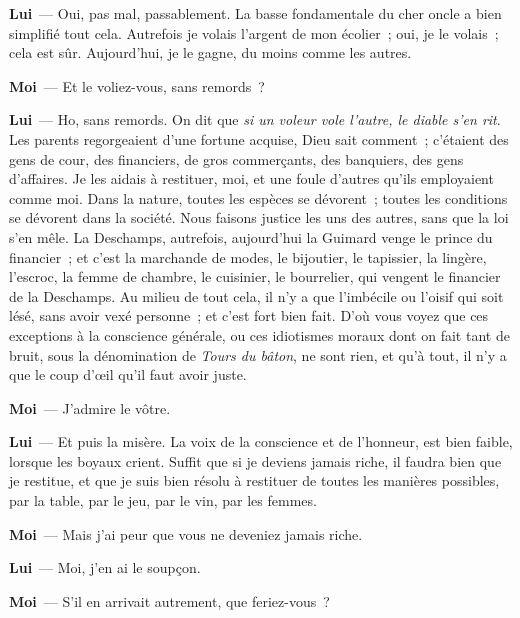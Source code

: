 \documentclass[french,twoside]{book} %
\newcommand{\labelchar}[1]{\textbf{\color{rubric} #1}}
\begin{document}
\labelchar{Lui} — Oui, pas mal, passablement. La basse fondamentale du cher oncle a bien simplifié tout cela. Autrefois je volais l’argent de mon écolier ; oui, je le volais ; cela est sûr. Aujourd’hui, je le gagne, du moins comme les autres.\par
\labelchar{Moi} — Et le voliez-vous, sans remords ?\par
\labelchar{Lui} — Ho, sans remords. On dit que \emph{si un voleur vole l’autre, le diable s’en rit}. Les parents regorgeaient d’une fortune acquise, Dieu sait comment ; c’étaient des gens de cour, des financiers, de gros commerçants, des banquiers, des gens d’affaires. Je les aidais à restituer, moi, et une foule d’autres qu’ils employaient comme moi. Dans la nature, toutes les espèces se dévorent ; toutes les conditions se dévorent dans la société. Nous faisons justice les uns des autres, sans que la loi s’en mêle. La Deschamps, autrefois, aujourd’hui la Guimard venge le prince du financier ; et c’est la marchande de modes, le bijoutier, le tapissier, la lingère, l’escroc, la femme de chambre, le cuisinier, le bourrelier, qui vengent le financier de la Deschamps. Au milieu de tout cela, il n’y a que l’imbécile ou l’oisif qui soit lésé, sans avoir vexé personne ; et c’est fort bien fait. D’où vous voyez que ces exceptions à la conscience générale, ou ces idiotismes moraux dont on fait tant de bruit, sous la dénomination de\emph{ Tours du bâton}, ne sont rien, et qu’à tout, il n’y a que le coup d’œil qu’il faut avoir juste.\par
\labelchar{Moi} — J’admire le vôtre.\par
\labelchar{Lui} — Et puis la misère. La voix de la conscience et de l’honneur, est bien faible, lorsque les boyaux crient. Suffit que si je deviens jamais riche, il faudra bien que je restitue, et que je suis bien résolu à restituer de toutes les manières possibles, par la table, par le jeu, par le vin, par les femmes.\par
\labelchar{Moi} — Mais j’ai peur que vous ne deveniez jamais riche.\par
\labelchar{Lui} — Moi, j’en ai le soupçon.\par
\labelchar{Moi} — S’il en arrivait autrement, que feriez-vous ?\par
\end{document}
